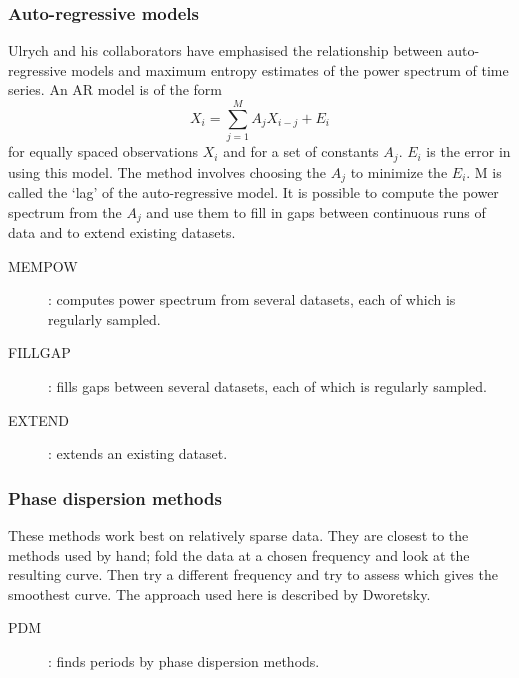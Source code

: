 \subsubsection {Auto-regressive models}
Ulrych and his collaborators have emphasised the relationship between
auto-regressive models and maximum entropy estimates of the power spectrum of
time series.
An AR model is of the form
\begin{equation}
X_{i}=\sum_{j=1}^{M} A_{j}X_{i-j}+E_{i}
\end{equation}
for equally spaced observations $X_{i}$ and for a set of constants $A_{j}$.
$E_{i}$ is the error in using this model.
The method involves choosing the $A_{j}$ to minimize the $E_{i}$.
M is called the `lag' of the auto-regressive model.
It is possible to compute the power spectrum from the $A_{j}$ and use them to
fill in gaps between continuous runs of data and to extend existing datasets.
\begin{description}
\item [MEMPOW]: computes power spectrum from several datasets, each of which is
regularly sampled.
\item [FILLGAP]: fills gaps between several datasets, each of which is
regularly sampled.
\item [EXTEND]: extends an existing dataset.
\end{description}
\subsubsection {Phase dispersion methods}
These methods work best on relatively sparse data.
They are closest to the methods used by hand; fold the data at a chosen
frequency and look at the resulting curve.
Then try a different frequency and try to assess which gives the smoothest
curve.
The approach used here is described by Dworetsky.
\begin{description}
\item [PDM]: finds periods by phase dispersion methods.
\end{description}
